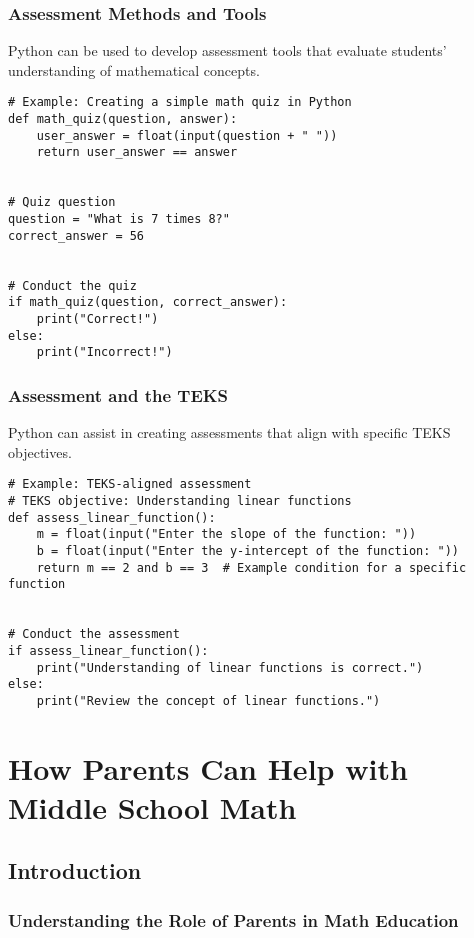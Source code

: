 \documentclass{book}
\begin{document}
\subsection{Assessment Methods and Tools}
Python can be used to develop assessment tools that evaluate students' understanding of mathematical concepts.


\begin{lstlisting}[style=pythonstyle]
# Example: Creating a simple math quiz in Python
def math_quiz(question, answer):
    user_answer = float(input(question + " "))
    return user_answer == answer


# Quiz question
question = "What is 7 times 8?"
correct_answer = 56


# Conduct the quiz
if math_quiz(question, correct_answer):
    print("Correct!")
else:
    print("Incorrect!")
\end{lstlisting}


\subsection{Assessment and the TEKS}
Python can assist in creating assessments that align with specific TEKS objectives.


\begin{lstlisting}[style=pythonstyle]
# Example: TEKS-aligned assessment
# TEKS objective: Understanding linear functions
def assess_linear_function():
    m = float(input("Enter the slope of the function: "))
    b = float(input("Enter the y-intercept of the function: "))
    return m == 2 and b == 3  # Example condition for a specific function


# Conduct the assessment
if assess_linear_function():
    print("Understanding of linear functions is correct.")
else:
    print("Review the concept of linear functions.")
\end{lstlisting}



\chapter{How Parents Can Help with Middle School Math}


\section{Introduction}
\subsection{Understanding the Role of Parents in Math Education}
\end{document}
